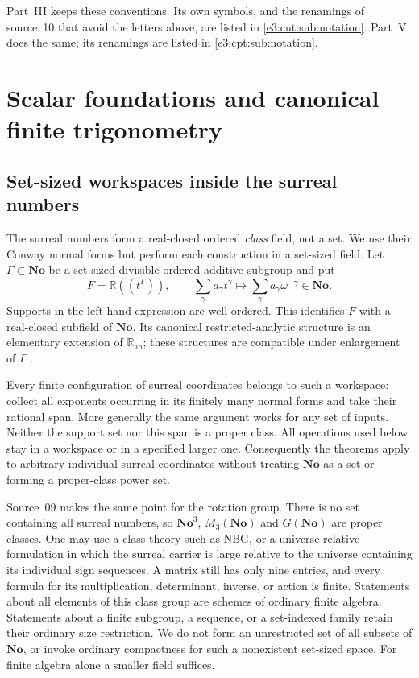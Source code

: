\documentclass[11pt,letterpaper]{article}
\numberwithin{equation}{section}
\theoremstyle{definition}
\theoremstyle{remark}
\newcommand{\No}{\mathbf{No}}
\newcommand{\R}{\mathbb R}
\begin{document}
Part~III keeps these conventions. Its own symbols, and the renamings of source~10
that avoid the letters above, are listed in \cref{e3:cut:sub:notation}. Part~V
does the same; its renamings are listed in \cref{e3:cpt:sub:notation}.

\section{Scalar foundations and canonical finite trigonometry}\label{e3:sec:scalars}

\subsection{Set-sized workspaces inside the surreal numbers}

The surreal numbers form a real-closed ordered \emph{class} field, not a set.
We use their Conway normal forms but perform each construction in a set-sized
field. Let $\Gamma\subset\No$ be a set-sized divisible ordered additive
subgroup and put
\begin{equation}\label{e3:eq:hahn}
 F=\R((t^\Gamma)),\qquad
 \sum_{\gamma} a_\gamma t^\gamma\longmapsto
 \sum_{\gamma} a_\gamma\omega^{-\gamma}\in\No.
\end{equation}
Supports in the left-hand expression are well ordered. This identifies $F$
with a real-closed subfield of $\No$. Its canonical restricted-analytic
structure is an elementary extension of $\R_{\mathrm{an}}$; these structures
are compatible under enlargement of $\Gamma$ \cite[\S2]{vdDE}.

Every finite configuration of surreal coordinates belongs to such a
workspace: collect all exponents occurring in its finitely many normal forms
and take their rational span. More generally the same argument works for any
set of inputs. Neither the support set nor this span is a proper class.
All operations used below stay in a workspace or in a specified larger one.
Consequently the theorems apply to arbitrary individual surreal coordinates
without treating $\No$ as a set or forming a proper-class power set.

Source~09 makes the same point for the rotation group. There is no set
containing all surreal numbers, so $\No^3$, $M_3(\No)$ and $G(\No)$ are proper
classes. One may use a class theory such as NBG, or a universe-relative
formulation in which the surreal carrier is large relative to the universe
containing its individual sign sequences. A matrix still has only nine entries,
and every formula for its multiplication, determinant, inverse, or action is
finite. Statements about all elements of this class group are schemes of
ordinary finite algebra. Statements about a finite subgroup, a sequence, or a
set-indexed family retain their ordinary size restriction. We do not form an
unrestricted set of all subsets of $\No$, or invoke ordinary compactness for
such a nonexistent set-sized space. For finite algebra alone a smaller field
suffices.
\end{document}
